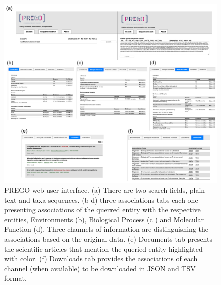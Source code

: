    \begin{figure}[h]
      \centering
      \includegraphics[width=0.98\columnwidth]{figures/prego_ui.png}
      \caption[PREGO web user interface]{
         PREGO web user interface. 
         (a) There are two search fields, plain text and taxa sequences. 
         (b-d) three associations tabs each one presenting associations of the querred entity with the respective entities, Environments (b), Biological Process (c ) and Molecular Function (d). 
         Three channels of information are distinguishing the associations based on the original data. 
         (e) Documents tab presents the scientific articles that mention the queried entity highlighted with color. 
         (f) Downloads tab provides the associations of each channel (when available) to be downloaded in JSON and TSV format.
      }
      \label{fig:prego_ui}
   \end{figure}


